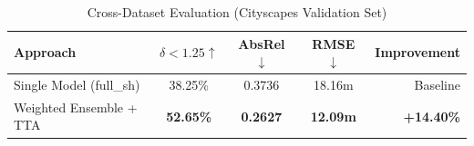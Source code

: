 \documentclass{article}
\begin{document}
\setcounter{table}{1}

\begin{table}[ht]
    \centering
    \caption{Cross-Dataset Evaluation (Cityscapes Validation Set)}
    \label{tab:cityscapes_eval}
    \begin{tabular}{lcccr}
        \toprule
        \textbf{Approach} & $\delta < 1.25 \uparrow$ & AbsRel $\downarrow$ & RMSE $\downarrow$ & Improvement \\
        \midrule
        Single Model (full\_sh) & 38.25\% & 0.3736 & 18.16m & Baseline \\
        Weighted Ensemble + TTA & \textbf{52.65\%} & \textbf{0.2627} & \textbf{12.09m} & \textbf{+14.40\%} \\
        \bottomrule
    \end{tabular}
\end{table}
\end{document}
